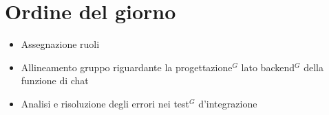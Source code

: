 \section*{Ordine del giorno}

\begin{itemize}
	\item Assegnazione ruoli
	\item Allineamento gruppo riguardante la progettazione$^G$ lato backend$^G$ della funzione di chat
	\item Analisi e risoluzione degli errori nei test$^G$ d'integrazione
\end{itemize}

